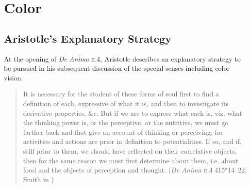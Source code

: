\chapter{Color} %
\label{cha:color}

\section{Aristotle's Explanatory Strategy} %
\label{sec:aristotle_s_explanatory_strategy}

At the opening of \emph{De Anima} \textsc{ii}.4, Aristotle describes an explanatory strategy to be pursued in his subsequent discussion of the special senses including color vision:
\begin{quote}
	It is necessary for the student of these forms of soul first to find a definition of each, expressive of what it is, and then to investigate its derivative properties, \&c. But if we are to express what each is, viz. what the thinking power is, or the perceptive, or the nutritive, we must go farther back and first give an account of thinking or perceiving; for activities and actions are prior in definition to potentialities. If so, and if, still prior to them, we should have reflected on their correlative objects, then for the same reason we must first determine about them, i.e. about food and the objects of perception and thought. (\emph{De Anima} \textsc{ii}.4 415\( ^{a} \)14--22; Smith in \citealt[26]{Barnes:1984uq})
\end{quote}
